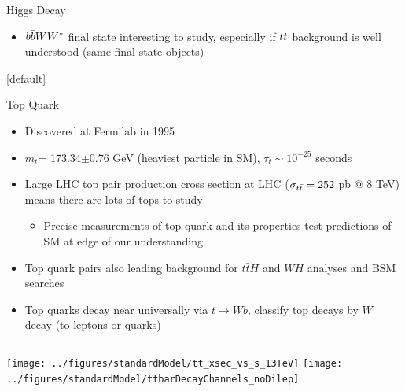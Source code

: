 \documentclass{beamer}
\newcommand*{\ttbar}{\ensuremath{\lowercase{t\bar{t}}}\xspace}
\newcommand*{\mt}{\ensuremath{m_{t}}\xspace}
\newcommand*{\bbWW}{\ensuremath{\lowercase{b\bar{b}}WW^*}\xspace}
\begin{document}
{\begin{frame} {Higgs Decay}
{\begin{itemize}
  \item \bbWW final state interesting to study, especially if \ttbar background is well understood (same final state objects)
  \end{itemize}
  }  
  \end{frame}

  \makeatletter %
  [default]
  \def\beamer@entrycode{\vspace*{-1.075\headheight}}
  \begin{frame} {Top Quark}
    \begin{itemize}\small
    \item Discovered at Fermilab in 1995
    \item \mt = 173.34$\pm$0.76 GeV (heaviest particle in SM), $\tau_t\sim10^{-25}$ seconds
    \item Large LHC top pair production cross section at LHC ($\sigma_{\ttbar} = 252$ pb @ 8 TeV) means there are lots of tops to study
      \begin{itemize}\footnotesize
      \item Precise measurements of top quark and its properties test predictions of SM at edge of our understanding
      \end{itemize}
    \item Top quark pairs also leading background for $t\bar{t}H$ and $WH$ analyses and BSM searches
    \item Top quarks decay near universally via $t\rightarrow Wb$, classify top decays by $W$ decay (to leptons or quarks)
    \end{itemize}
    \vspace{-3pt}
    \begin{columns}
      \texttt{[image: ../figures/standardModel/tt\_xsec\_vs\_s\_13TeV]}
      \texttt{[image: ../figures/standardModel/ttbarDecayChannels\_noDilep]}
    \end{columns}
  \end{frame}

}
\end{document}
